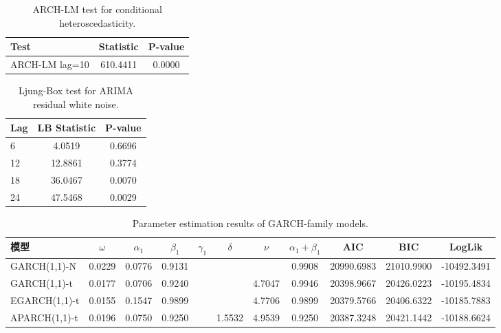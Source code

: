 \begin{table}[htbp]
  \centering
  \caption{ARCH-LM test for conditional heteroscedasticity.}
  \label{tab:arch_test}
  \begin{tabular}{lcc}
    \toprule
    Test & Statistic & P-value \\
    \midrule
    ARCH-LM lag=10 & 610.4411 & 0.0000 \\
    \bottomrule
  \end{tabular}
\end{table}

\begin{table}[htbp]
  \centering
  \caption{Ljung-Box test for ARIMA residual white noise.}
  \label{tab:arima_resid}
  \begin{tabular}{lcc}
    \toprule
    Lag & LB Statistic & P-value \\
    \midrule
    6 & 4.0519 & 0.6696 \\
    12 & 12.8861 & 0.3774 \\
    18 & 36.0467 & 0.0070 \\
    24 & 47.5468 & 0.0029 \\
    \bottomrule
  \end{tabular}
\end{table}

\begin{table}[htbp]
  \centering
  \caption{Parameter estimation results of GARCH-family models.}
  \label{tab:model_params}
  \begin{tabular}{lcccccccccc}
    \toprule
    模型 & $\omega$ & $\alpha_1$ & $\beta_1$ & $\gamma_1$ & $\delta$ & $\nu$ & $\alpha_1+\beta_1$ & AIC & BIC & LogLik \\
    \midrule
    GARCH(1,1)-N & 0.0229 & 0.0776 & 0.9131 &  &  &  & 0.9908 & 20990.6983 & 21010.9900 & -10492.3491 \\
    GARCH(1,1)-t & 0.0177 & 0.0706 & 0.9240 &  &  & 4.7047 & 0.9946 & 20398.9667 & 20426.0223 & -10195.4834 \\
    EGARCH(1,1)-t & 0.0155 & 0.1547 & 0.9899 &  &  & 4.7706 & 0.9899 & 20379.5766 & 20406.6322 & -10185.7883 \\
    APARCH(1,1)-t & 0.0196 & 0.0750 & 0.9250 &  & 1.5532 & 4.9539 & 0.9250 & 20387.3248 & 20421.1442 & -10188.6624 \\
    \bottomrule
  \end{tabular}
\end{table}

